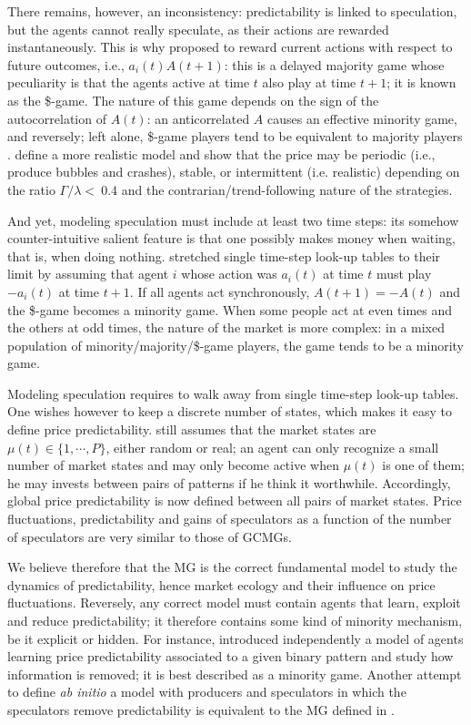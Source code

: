 \documentclass[aps,twocolumn,nofootinbib,sortedaddress,reprint]{revtex4-1}
\begin{document}
There remains, however, an inconsistency: predictability is linked to
speculation, but the agents cannot really speculate, as their actions
are rewarded instantaneously.  This is why \textcite{BouchaudGiardina,dollargame}
proposed to reward current actions with
respect to future outcomes, i.e., $a_i(t)A(t+1)$: this is a delayed
majority game whose peculiarity is that the agents active at time $t$ also play at time
$t+1$; it is known as the \$-game. The nature of this game depends on the sign of the
autocorrelation of $A(t)$: an anticorrelated $A$ causes an effective
minority game, and reversely; left alone, \$-game players tend to be
equivalent to majority players \cite{ferreira2005real,satinover2008cycles}. \textcite{BouchaudGiardina}define a more  realistic model and show that the price may be periodic (i.e., produce bubbles and crashes), stable, or intermittent (i.e. realistic) depending on the ratio $\Gamma/\lambda<~0.4$  and the contrarian/trend-following nature of the strategies.

And yet, modeling speculation must include at least two time steps:
its somehow counter-intuitive salient feature is that one possibly
makes money when waiting, that is, when doing
nothing. \textcite{ferreira2005real} stretched single time-step
look-up tables to their limit by assuming that agent $i$ whose action
was $a_i(t)$ at time $t$ must play $-a_i(t)$ at time $t+1$. If all
agents act synchronously, $A(t+1)=-A(t)$ and the \$-game becomes a
minority game. When some people act at even times and the others at
odd times, the nature of the market is more complex: in a mixed
population of minority/majority/\$-game players, the game tends to be
a minority game.

Modeling speculation requires to walk away from single time-step look-up tables. One
wishes however to keep a discrete number of states, which makes it
easy to define price predictability. \textcite{C05} still assumes that
the market states are $\mu(t)\in\{1,\cdots,P\}$, either random or
real; an agent can only recognize a small number of market states and may only
become active when $\mu(t)$ is one of them; he may invests between
pairs of patterns if he think it worthwhile. Accordingly, global price
predictability is now defined between all pairs of market
states. Price fluctuations, predictability and gains of speculators as a
function of the number of speculators are very similar to those of
GCMGs.

We believe therefore that the MG is the correct fundamental model to
study the dynamics of predictability, hence market ecology and their
influence on price fluctuations. Reversely, any correct model must
contain agents that learn, exploit and reduce predictability; it
therefore contains some kind of minority mechanism, be it explicit or
hidden. For instance, \textcite{hasanhodzic2011computational}
introduced independently a model of agents learning price
predictability associated to a given binary pattern and study how
information is removed; it is best described as a minority
game. Another attempt to define {\em ab initio} a model with producers
and speculators in which the speculators remove
predictability \cite{patzelt2012unstable} is equivalent to the MG defined
in \textcite{galla2009minority}.
\end{document}
